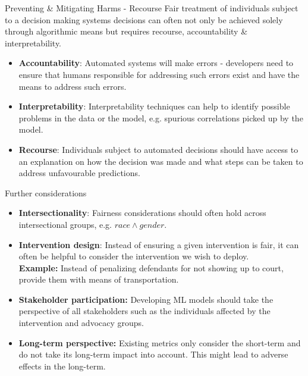 \documentclass[11pt,compress,t,notes=noshow, xcolor=table]{beamer}
\begin{document}
\begin{vbframe}{Preventing \& Mitigating Harms - Recourse}
  Fair treatment of individuals subject to a decision making systems decisions can often not only be achieved solely through algorithmic means
  but requires recourse, accountability \& interpretability.
  \begin{itemize}
    \item \textbf{Accountability}: Automated systems will make errors - developers need to ensure that humans responsible for addressing such errors exist and have the means to address such errors.
    \item \textbf{Interpretability}: Interpretability techniques can help to identify possible problems in the data or the model, e.g. spurious correlations picked up by the model.
    \item \textbf{Recourse}: Individuals subject to automated decisions should have access to an explanation on how the decision was made and what steps can be taken to address unfavourable predictions.
  \end{itemize} 
\end{vbframe}


\begin{vbframe}{Further considerations}
  \begin{itemize}
    \item \textbf{Intersectionality}: Fairness considerations should often hold across intersectional groups, e.g. $race \land gender$.
    \item \textbf{Intervention design}: Instead of ensuring a given intervention is fair, it can often be helpful to consider the intervention we wish to deploy. \\
    \textbf{Example:} Instead of penalizing defendants for not showing up to court, provide them with means of transportation.
    \item \textbf{Stakeholder participation:} Developing ML models should take the perspective of all stakeholders such as the individuals affected by the intervention and advocacy groups.
    \item \textbf{Long-term perspective:} Existing metrics only consider the short-term and do not take its long-term impact into account. This might lead to adverse effects in the long-term.
  \end{itemize}
\end{vbframe}
\end{document}
